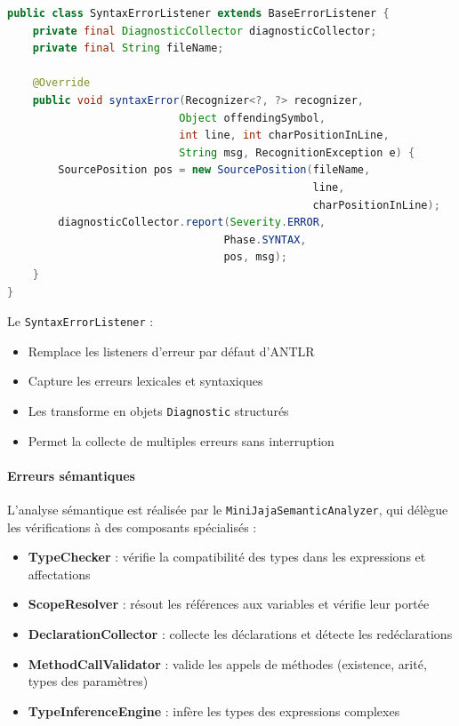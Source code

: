 \vspace{0.3cm}
\begin{lstlisting}[language=java, caption=SyntaxErrorListener,label={lst:syntaxerrorlistener}]
public class SyntaxErrorListener extends BaseErrorListener {
    private final DiagnosticCollector diagnosticCollector;
    private final String fileName;

    @Override
    public void syntaxError(Recognizer<?, ?> recognizer,
                           Object offendingSymbol,
                           int line, int charPositionInLine,
                           String msg, RecognitionException e) {
        SourcePosition pos = new SourcePosition(fileName,
                                                line,
                                                charPositionInLine);
        diagnosticCollector.report(Severity.ERROR,
                                  Phase.SYNTAX,
                                  pos, msg);
    }
}
\end{lstlisting}

Le \texttt{SyntaxErrorListener} :
\begin{itemize}
    \item Remplace les listeners d'erreur par défaut d'ANTLR
    \item Capture les erreurs lexicales et syntaxiques
    \item Les transforme en objets \texttt{Diagnostic} structurés
    \item Permet la collecte de multiples erreurs sans interruption
\end{itemize}

\paragraph{Erreurs sémantiques}

L'analyse sémantique est réalisée par le \texttt{MiniJajaSemanticAnalyzer}, qui délègue les vérifications à des composants spécialisés :

\begin{itemize}
    \item \textbf{TypeChecker} : vérifie la compatibilité des types dans les expressions et affectations
    \item \textbf{ScopeResolver} : résout les références aux variables et vérifie leur portée
    \item \textbf{DeclarationCollector} : collecte les déclarations et détecte les redéclarations
    \item \textbf{MethodCallValidator} : valide les appels de méthodes (existence, arité, types des paramètres)
    \item \textbf{TypeInferenceEngine} : infère les types des expressions complexes
\end{itemize}

